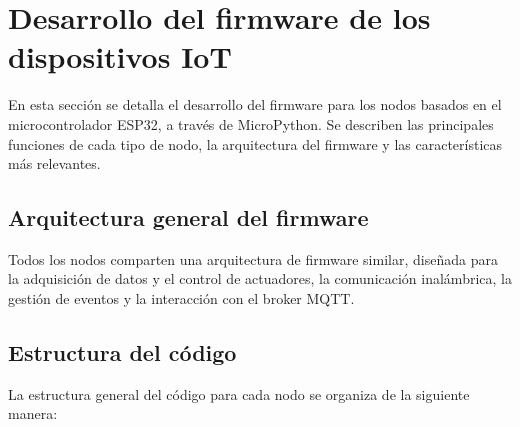 
\section{Desarrollo del firmware de los dispositivos IoT}

En esta sección se detalla el desarrollo del firmware para los nodos 
basados en el microcontrolador ESP32, a través de MicroPython. Se describen las
principales funciones de cada tipo de nodo, la arquitectura del firmware y las
características más relevantes.

\subsection{Arquitectura general del firmware}

Todos los nodos comparten una arquitectura de firmware similar, diseñada para
la adquisición de datos y el control de actuadores, la comunicación
inalámbrica, la gestión de eventos y la interacción con el broker MQTT.

\subsection{Estructura del código}

La estructura general del código para cada nodo se organiza de la siguiente
manera:

